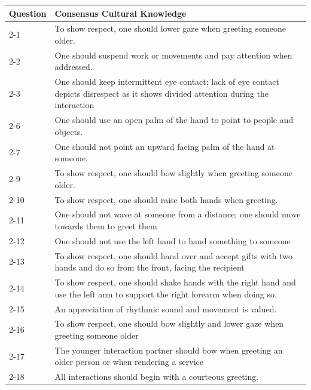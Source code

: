 \documentclass{CSSRforAfrica}
\begin{document}
\begin{table}[H]
\begin{center}
\vspace{-5mm}
\begin{tabularx}{\linewidth}{|l|X|}
\hline \hline
 {\small {\bf Question}}  & {\small {\bf Consensus Cultural Knowledge}}\\
\hline
 {\small 2-1 } & {\small To show respect, one should lower gaze when greeting someone older.}\\
 {\small 2-2 } & {\small One should suspend work or movements and pay attention when addressed.}\\
 {\small 2-3 } & {\small One should keep intermittent eye contact; lack of eye contact depicts disrespect as it shows divided
attention during the interaction}\\
{\small 2-6 }  & {\small One should use an open palm of the hand to point to people and objects.}\\
{\small 2-7 }  & {\small One should not point an upward facing palm of the hand at someone.}\\
{\small 2-9 }  & {\small To show respect, one should bow slightly when greeting someone older.}\\
{\small 2-10 } & {\small To show respect, one should raise both hands when greeting.}\\
{\small 2-11 } & {\small One should not wave at someone from a distance; one should move towards them to greet them}\\
{\small 2-12 } & {\small One should not use the left hand to hand something to someone}\\
{\small 2-13 } & {\small To show respect, one should hand over and accept gifts with two hands and do so from the front,
facing the recipient}\\
{\small 2-14 } & {\small To show respect, one should shake hands with the right hand and use the left arm to support the
right forearm when doing so.}\\
{\small 2-15 } & {\small An appreciation of rhythmic sound and movement is valued.}\\
{\small 2-16 } & {\small To show respect, one should bow slightly and lower gaze when greeting someone older}\\
{\small 2-17 } & {\small The younger interaction partner should bow when greeting an older person or when rendering a
service}\\
{\small 2-18 } & {\small All interactions should begin with a courteous greeting.}\\

\end{tabularx}
\end{center}
\end{table}
\end{document}
